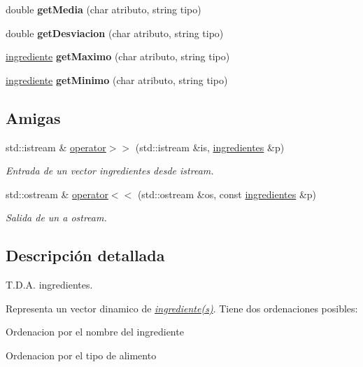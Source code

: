 \begin{DoxyCompactItemize}
double {\bfseries get\+Media} (char atributo, string tipo)
\item 
\mbox{\label{classingredientes_adc3f70ae78a02993e6a4b8dac6a4ba07}} 
double {\bfseries get\+Desviacion} (char atributo, string tipo)
\item 
\mbox{\label{classingredientes_a6e4cfe264fddd851ccf2f2061d6b66ce}} 
\hyperlink{classingrediente}{ingrediente} {\bfseries get\+Maximo} (char atributo, string tipo)
\item 
\mbox{\label{classingredientes_a0ec4fb15cad1b31709b24751abdf2067}} 
\hyperlink{classingrediente}{ingrediente} {\bfseries get\+Minimo} (char atributo, string tipo)
\end{DoxyCompactItemize}
\subsection*{Amigas}
\begin{DoxyCompactItemize}
\item 
std\+::istream \& \hyperlink{classingredientes_adfbb6b2de8bd8b193715a3d58c313b84}{operator$>$$>$} (std\+::istream \&is, \hyperlink{classingredientes}{ingredientes} \&p)
\begin{DoxyCompactList}\small\item\em Entrada de un vector ingredientes desde istream. \end{DoxyCompactList}\item 
std\+::ostream \& \hyperlink{classingredientes_a47b68f377e21ce26320b8adb9c72f347}{operator$<$$<$} (std\+::ostream \&os, const \hyperlink{classingredientes}{ingredientes} \&p)
\begin{DoxyCompactList}\small\item\em Salida de un a ostream. \end{DoxyCompactList}\end{DoxyCompactItemize}


\subsection{Descripción detallada}
T.\+D.\+A. ingredientes. 

Representa un vector dinamico de {\itshape \hyperlink{classingrediente}{ingrediente(s)}}. Tiene dos ordenaciones posibles\+:


\begin{DoxyItemize}
\item Ordenacion por el nombre del ingrediente
\item Ordenacion por el tipo de alimento
\end{DoxyItemize}

